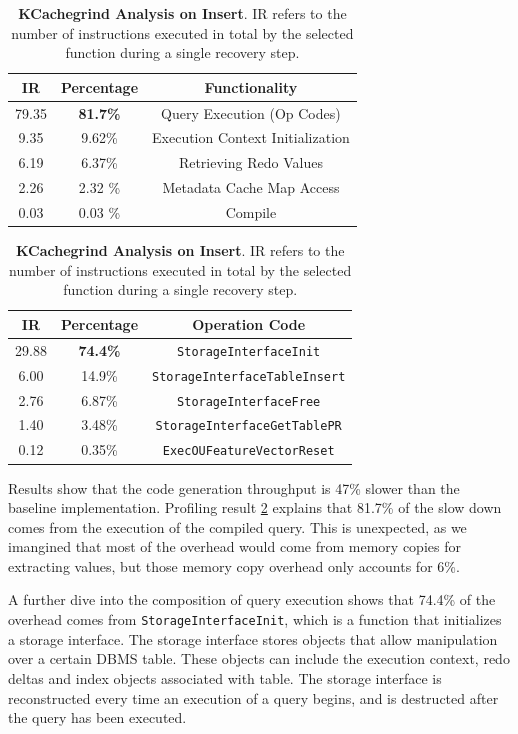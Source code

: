 \documentclass[12pt]{cmuthesis}
\begin{document}
\begin{table}[H]
\begin{center}
\begin{tabular}{ |c|c|c| } 
 \hline
\textbf{IR} & \textbf{Percentage} & \textbf{Functionality} \\ 
 \hline
79.35 & \textbf{81.7\%} & Query Execution (Op Codes)\\
 \hline
 9.35 & 9.62\% & Execution Context Initialization \\ 
 \hline
 6.19 & 6.37\% & Retrieving Redo Values \\
 \hline
 2.26 & 2.32 \% & Metadata  Cache Map Access \\
 \hline
 0.03 & 0.03 \% & Compile \\
 \hline
\end{tabular}

\begin{tabular}{ |c|c|c| } 
 \hline
\textbf{IR} & \textbf{Percentage} & \textbf{Operation Code}\\ 
 \hline
29.88 & \textbf{74.4\%} & \texttt{StorageInterfaceInit}\\
 \hline
 6.00 & 14.9\% & \texttt{StorageInterfaceTableInsert} \\ 
 \hline
 2.76 & 6.87\% & \texttt{StorageInterfaceFree} \\
 \hline
 1.40 & 3.48\% & \texttt{StorageInterfaceGetTablePR} \\
 \hline
 0.12 & 0.35\% & \texttt{ExecOUFeatureVectorReset} \\
 \hline
\end{tabular}
\caption{\textbf{KCachegrind Analysis on Insert}. IR refers to the number of instructions executed in total by the selected function during a single recovery step.}
\label{tab:throughput_exp_insert_overhead_all}
\end{center}
\end{table}
Results show that the code generation throughput is 47\% slower than the baseline implementation. Profiling result \ref{tab:throughput_exp_insert_overhead_all} explains that 81.7\% of the slow down comes from the execution of the compiled query. This is unexpected, as we imangined that most of the overhead would come from memory copies for extracting values, but those memory copy overhead only accounts for 6\%.

A further dive into the composition of query execution shows that 74.4\% of the overhead comes from \texttt{StorageInterfaceInit}, which is a function that initializes a storage interface. The storage interface stores objects that allow manipulation over a certain DBMS table. These objects can include the execution context, redo deltas and index objects associated with table. The storage interface is reconstructed every time an execution of a query begins, and is destructed after the query has been executed.
\end{document}

